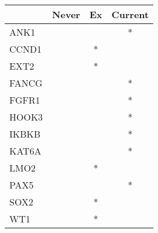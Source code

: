 \begin{tabular}{lccc}
\toprule
{} & Never & Ex & Current \\
\midrule
ANK1  &       &    &       * \\
CCND1 &       &  * &         \\
EXT2  &       &  * &         \\
FANCG &       &    &       * \\
FGFR1 &       &    &       * \\
HOOK3 &       &    &       * \\
IKBKB &       &    &       * \\
KAT6A &       &    &       * \\
LMO2  &       &  * &         \\
PAX5  &       &    &       * \\
SOX2  &       &  * &         \\
WT1   &       &  * &         \\
\bottomrule
\end{tabular}
